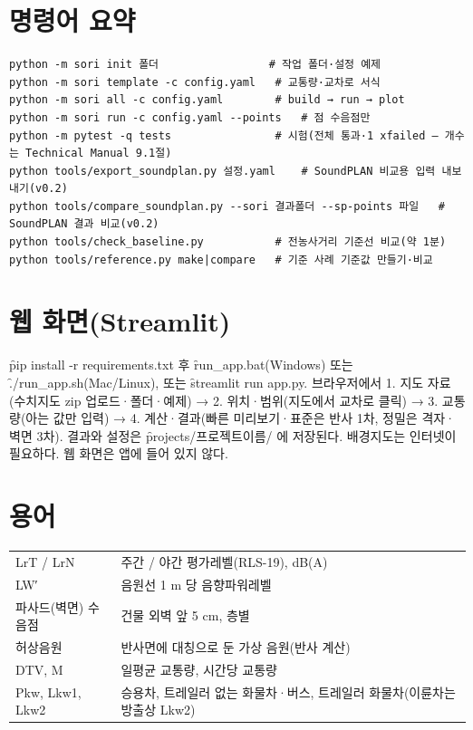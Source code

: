 \documentclass[10.5pt,a4paper]{article}
\begin{document}
\appendix
\section{명령어 요약}
\begin{Verbatim}
python -m sori init 폴더                 # 작업 폴더·설정 예제
python -m sori template -c config.yaml   # 교통량·교차로 서식
python -m sori all -c config.yaml        # build → run → plot
python -m sori run -c config.yaml --points   # 점 수음점만
python -m pytest -q tests                # 시험(전체 통과·1 xfailed — 개수는 Technical Manual 9.1절)
python tools/export_soundplan.py 설정.yaml    # SoundPLAN 비교용 입력 내보내기(v0.2)
python tools/compare_soundplan.py --sori 결과폴더 --sp-points 파일   # SoundPLAN 결과 비교(v0.2)
python tools/check_baseline.py           # 전농사거리 기준선 비교(약 1분)
python tools/reference.py make|compare   # 기준 사례 기준값 만들기·비교
\end{Verbatim}

\section{웹 화면(Streamlit)}
\f{pip install -r requirements.txt} 후 \f{run\_app.bat}(Windows) 또는 \f{./run\_app.sh}(Mac/Linux), 또는 \f{streamlit run app.py}. 브라우저에서 1. 지도 자료(수치지도 zip 업로드·폴더·예제) → 2. 위치·범위(지도에서 교차로 클릭) → 3. 교통량(아는 값만 입력) → 4. 계산·결과(빠른 미리보기·표준은 반사 1차, 정밀은 격자·벽면 3차). 결과와 설정은 \f{projects/프로젝트이름/} 에 저장된다. 배경지도는 인터넷이 필요하다. 웹 화면은 앱에 들어 있지 않다.

\section{용어}
\begin{tabularx}{\textwidth}{P{30mm}L}
\toprule
LrT / LrN & 주간 / 야간 평가레벨(RLS-19), dB(A) \\
LW′ & 음원선 1 m 당 음향파워레벨 \\
파사드(벽면) 수음점 & 건물 외벽 앞 5 cm, 층별 \\
허상음원 & 반사면에 대칭으로 둔 가상 음원(반사 계산) \\
DTV, M & 일평균 교통량, 시간당 교통량 \\
Pkw, Lkw1, Lkw2 & 승용차, 트레일러 없는 화물차·버스, 트레일러 화물차(이륜차는 방출상 Lkw2) \\
\bottomrule
\end{tabularx}
\end{document}
